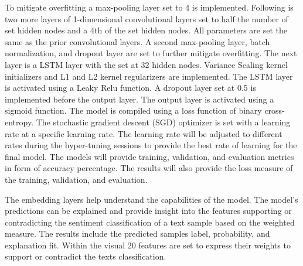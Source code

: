 \documentclass[conference,final,]{IEEEtran}
\begin{document}
To mitigate overfitting a max-pooling layer set to 4 is implemented.
Following is two more layers of 1-dimensional convolutional layers set to half the number of set hidden nodes and a 4th of the set hidden nodes.
All parameters are set the same as the prior convolutional layers.
A second max-pooling layer, batch normalization, and dropout layer are set to further mitigate overfitting.
The next layer is a LSTM layer with the set at 32 hidden nodes. Variance Scaling kernel initializers and L1 and L2 kernel regularizers are implemented.
The LSTM layer is activated using a Leaky Relu function.
A dropout layer set at 0.5 is implemented before the output layer. The output layer is activated using a sigmoid function.
The model is compiled using a loss function of binary cross-entropy.
The stochastic gradient descent (SGD) optimizer is set with a learning rate at a specific learning rate.
The learning rate will be adjusted to different rates during the hyper-tuning sessions to provide the best rate of learning for the final model.
The models will provide training, validation, and evaluation metrics in form of accuracy percentage.
The results will also provide the loss measure of the training, validation, and evaluation.

The embedding layers help understand the capabilities of the model.
The model's predictions can be explained and provide insight into the features supporting or contradicting the sentiment classification of a text sample based on the weighted measure.
The results include the predicted samples label, probability, and explanation fit.
Within the visual 20 features are set to express their weights to support or contradict the texts classification.
\end{document}
